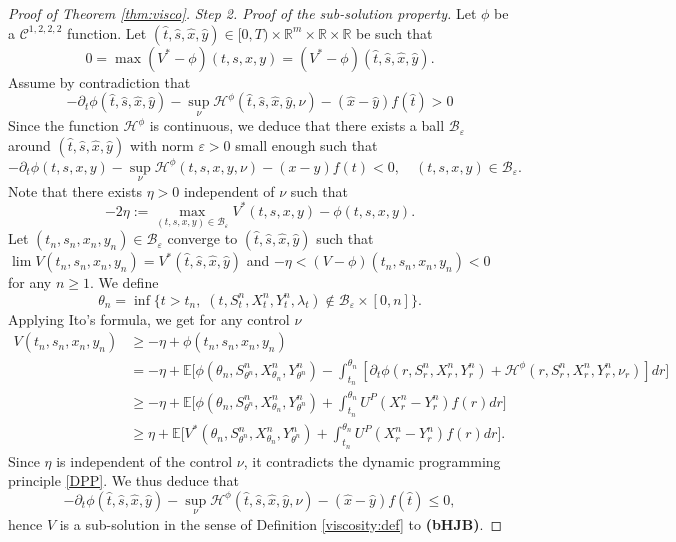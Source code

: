 \documentclass[10pt,a4paper]{amsart}
\begin{document}
\begin{proof}[Proof of Theorem \ref{thm:visco}]
        \textit{Step 2. Proof of the sub-solution property.} Let $\phi$ be a $\mathcal C^{1,2,2,2}$ function. Let $(\hat t,\hat s,\hat x,\hat y)\in [0,T)\times \mathbb R^m\times \mathbb R\times \mathbb R$ be such that 
    \[0=\max (V^*-\phi)(t,s,x,y)=(V^*-\phi)(\hat t,\hat s,\hat x,\hat y).\] Assume by contradiction that 
    \begin{equation*}\label{contradiction} -\partial_t \phi(\hat t,\hat s,\hat x,\hat y)-\sup_\nu \mathcal H^\phi(\hat t,\hat s,\hat x,\hat y,\nu)-(\hat x - \hat y) f(\hat t)>0\end{equation*}
    Since the function $\mathcal H^\phi$ is continuous, we deduce that there exists a ball $\mathcal B_\varepsilon$ around $(\hat t,\hat s,\hat x,\hat y)$ with norm $\varepsilon>0$ small enough such that 
    \[ -\partial_t \phi(t,s,x,y)- \sup_\nu \mathcal H^\phi(t,s,x,y,\nu)-(x-y) f(t)<0,\quad (t,s,x,y)\in \mathcal B_\varepsilon.\]
    Note that there exists $\eta>0$ independent of $\nu$ such that \[-2\eta:=\max_{(t,s,x,y)\in \mathcal B_\varepsilon}V^*(t,s,x,y)-\phi(t,s,x,y).\]
    Let $(t_n,s_n,x_n,y_n)\in \mathcal B_\varepsilon$ converge to $(\hat t,\hat s,\hat x,\hat y)$ such that $\lim\limits V(t_n,s_n,x_n,y_n)=V^*(\hat t,\hat s,\hat x,\hat y)$ and $-\eta<(V-\phi)(t_n,s_n,x_n,y_n)<0$ for any $n\geq 1$. We define 
    \[\theta_n=\inf\{t>t_n,\; (t,S^n_t,X^n_t,Y^n_t,\lambda_t)\notin \mathcal B_\varepsilon\times [0,n]\}.\]
Applying Ito's formula, we get for any control $\nu$
\begin{align*}
    V(t_n,s_n,x_n,y_n)&\geq -\eta+\phi(t_n,s_n,x_n,y_n)\\
    &=-\eta +\mathbb E\big[\phi(\theta_n,S_{\theta^n}^n,X_{\theta_n}^n,Y_{\theta^n}^n) -\int_{t_n}^{\theta_n}[\partial_t \phi(r,S_r^n,X_r^n,Y_r^n)+\mathcal H^{\phi}(r,S_r^n,X_r^n,Y_r^n,\nu_r)] dr\big]\\
    &\geq -\eta +\mathbb E\big[\phi(\theta_n,S_{\theta^n}^n,X_{\theta_n}^n,Y_{\theta^n}^n) +\int_{t_n}^{\theta_n}U^P(X_r^n-Y_r^n)f(r) dr\big]\\
    &\geq \eta+\mathbb E\big[V^*(\theta_n,S_{\theta^n}^n,X_{\theta_n}^n,Y_{\theta^n}^n) +\int_{t_n}^{\theta_n}U^P(X_r^n-Y_r^n)f(r) dr\big].
\end{align*}
 Since $\eta$ is independent of the control $\nu$, it contradicts the dynamic programming principle \eqref{DPP}. We thus deduce that 
 \[ -\partial_t \phi(\hat t,\hat s,\hat x,\hat y)-\sup_\nu \mathcal H^\phi(\hat t,\hat s,\hat x,\hat y,\nu)-(\hat x - \hat y) f(\hat t)\leq 0,\]
 hence $V$ is a sub-solution in the sense of Definition \ref{viscosity:def} to \textbf{(bHJB)}.
\end{proof}
\end{document}
